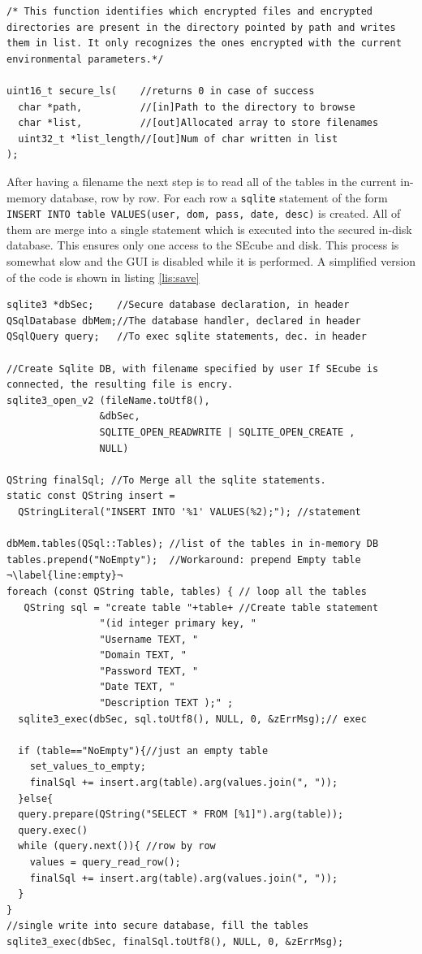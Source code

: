 \begin{lstlisting}[style=customc, float=htb, caption={\texttt{secure\_ls} declaration}, label = {lis:securels}]
 /* This function identifies which encrypted files and encrypted directories are present in the directory pointed by path and writes them in list. It only recognizes the ones encrypted with the current environmental parameters.*/
 
uint16_t secure_ls(    //returns 0 in case of success
  char *path,          //[in]Path to the directory to browse
  char *list,          //[out]Allocated array to store filenames
  uint32_t *list_length//[out]Num of char written in list
);
\end{lstlisting}


After having a filename the next step is to read all of the tables in the current in-memory database, row by row. For each row a \texttt{sqlite} statement of the form \texttt{INSERT INTO table VALUES(user, dom, pass, date, desc)} is created. All of them are merge into a single statement which is executed into the secured in-disk database. This ensures only one access to the SEcube and disk. This process is somewhat slow and the GUI is disabled while it is performed. A simplified version of the code is shown in listing \ref{lis:save} 

\begin{lstlisting}[style=customc, float=htb, caption={simplified Save process}, label = {lis:save}, escapechar=¬]
sqlite3 *dbSec;    //Secure database declaration, in header
QSqlDatabase dbMem;//The database handler, declared in header 
QSqlQuery query;   //To exec sqlite statements, dec. in header

//Create Sqlite DB, with filename specified by user If SEcube is connected, the resulting file is encry.
sqlite3_open_v2 (fileName.toUtf8(),   
                &dbSec, 
                SQLITE_OPEN_READWRITE | SQLITE_OPEN_CREATE , 
                NULL) 
                
QString finalSql; //To Merge all the sqlite statements.
static const QString insert = 
  QStringLiteral("INSERT INTO '%1' VALUES(%2);"); //statement
  
dbMem.tables(QSql::Tables); //list of the tables in in-memory DB
tables.prepend("NoEmpty");  //Workaround: prepend Empty table   ¬\label{line:empty}¬
foreach (const QString table, tables) { // loop all the tables
   QString sql = "create table "+table+ //Create table statement 
                "(id integer primary key, "
                "Username TEXT, "
                "Domain TEXT, "
                "Password TEXT, "
                "Date TEXT, "
                "Description TEXT );" ; 
  sqlite3_exec(dbSec, sql.toUtf8(), NULL, 0, &zErrMsg);// exec
  
  if (table=="NoEmpty"){//just an empty table
    set_values_to_empty;
    finalSql += insert.arg(table).arg(values.join(", "));
  }else{
  query.prepare(QString("SELECT * FROM [%1]").arg(table));
  query.exec()
  while (query.next()){ //row by row
    values = query_read_row();
    finalSql += insert.arg(table).arg(values.join(", "));
  }
}
//single write into secure database, fill the tables
sqlite3_exec(dbSec, finalSql.toUtf8(), NULL, 0, &zErrMsg);
\end{lstlisting}

